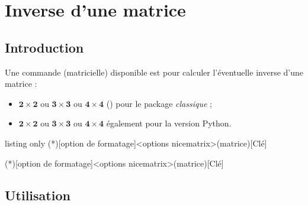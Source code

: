 \documentclass[french,a4paper,11pt]{article}
\newcommand\cmaj[1]{\tcbox[vignetteMaJ]{#1}\xspace}
\begin{document}
\section{Inverse d'une matrice}

\subsection{Introduction}

\begin{cautionblock}
Une commande (matricielle) disponible est pour calculer l'éventuelle inverse d'une matrice :

\begin{itemize}
	\item $\mathbf{2\times2}$ ou $\mathbf{3\times3}$ ou $\mathbf{4\times4}$ (\cmaj{0.1.5}) pour le package \textit{classique} ;
	\item $\mathbf{2\times2}$ ou $\mathbf{3\times3}$ ou $\mathbf{4\times4}$ également pour la version \textsf{Python}.
\end{itemize}
\vspace*{-\baselineskip}\leavevmode
\end{cautionblock}

\begin{PresentationCode}{listing only}
\MatriceInverse(*)[option de formatage]<options nicematrix>(matrice)[Clé]

\MatriceInversePY(*)[option de formatage]<options nicematrix>(matrice)[Clé]
\end{PresentationCode}

\subsection{Utilisation}
\end{document}
